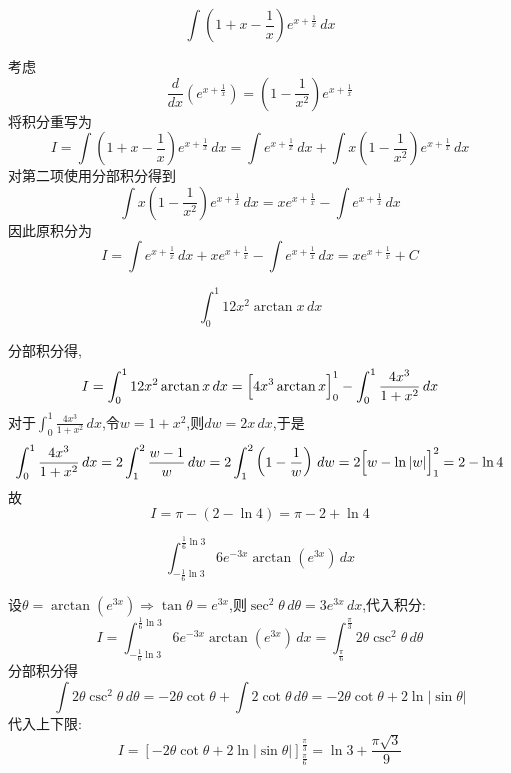 \begin{questions}
    \question
    \[
    \int \left(1 + x - \frac{1}{x}\right) e^{x+\frac{1}{x}} \,dx
    \]
    \begin{solution}
        考虑
        \[
        \frac{d}{dx}\left(e^{x+\frac{1}{x}}\right) = \left(1 - \frac{1}{x^2}\right) e^{x+\frac{1}{x}}
        \]
        将积分重写为
        \[
        I=\int \left(1 + x - \frac{1}{x}\right) e^{x+\frac{1}{x}} \,dx = \int e^{x+\frac{1}{x}} \,dx + \int x \left(1 - \frac{1}{x^2}\right) e^{x+\frac{1}{x}} \,dx
        \]
        对第二项使用分部积分得到
        \[
        \int x \left(1 - \frac{1}{x^2}\right) e^{x+\frac{1}{x}} \,dx = x e^{x+\frac{1}{x}} - \int e^{x+\frac{1}{x}} \,dx
        \]
        因此原积分为
        \[
        I = \int e^{x+\frac{1}{x}} \,dx + x e^{x+\frac{1}{x}} - \int e^{x+\frac{1}{x}} \,dx = x e^{x+\frac{1}{x}} + C
        \]
    \end{solution}

    \question
    \[
    \int_{0}^{1} 12x^2 \arctan x \,dx
    \]
    \begin{solution}
        分部积分得,
        \[
        I=\int_{0}^{1} 12x^2 \arctan x \,dx = \Bigl[ 4x^3 \arctan x \Bigr]_{0}^{1} - \int_{0}^{1} \frac{4x^3}{1+x^2} \,dx
        \]
        对于$\displaystyle \int_{0}^{1} \frac{4x^3}{1+x^2} \,dx$,令$w = 1+x^2$,则$dw = 2x \,dx$,于是
        \[
        \int_{0}^{1} \frac{4x^3}{1+x^2} \,dx = 2 \int_{1}^{2} \frac{w-1}{w} \,dw = 2 \int_{1}^{2} \left( 1 - \frac{1}{w} \right) \,dw = 2 \Bigl[ w - \ln|w|\Bigr]_{1}^{2}=2 - \ln 4
        \]
        故
        \[
        I = \pi - (2 - \ln 4) = \pi - 2 + \ln 4
        \]
    \end{solution}

    \question 
    \[
    \int_{-\frac{1}{6}\ln 3}^{\frac{1}{6}\ln 3} 6 e^{-3x} \arctan(e^{3x}) \, dx
    \]
    \begin{solution}
        设$\theta = \arctan(e^{3x}) \Rightarrow \tan\theta = e^{3x}$,则$\sec^2\theta \, d\theta = 3 e^{3x} \, dx$,代入积分:
        \[
        I=\int_{-\frac{1}{6}\ln 3}^{\frac{1}{6}\ln 3} 6 e^{-3x} \arctan(e^{3x}) \, dx = \int_{\frac{\pi}{6}}^{\frac{\pi}{3}} 2 \theta \csc^2 \theta \, d\theta
        \]
        分部积分得
        \[
        \int 2 \theta \csc^2 \theta \, d\theta = -2 \theta \cot \theta + \int 2 \cot \theta \, d\theta = -2 \theta \cot \theta + 2 \ln|\sin\theta|
        \]
        代入上下限:
        \[
        I=\left[ -2\theta\cot\theta + 2\ln|\sin\theta| \right]_{\frac{\pi}{6}}^{\frac{\pi}{3}} = \ln 3 + \frac{\pi \sqrt{3}}{9}
        \]
    \end{solution}


\end{questions}
